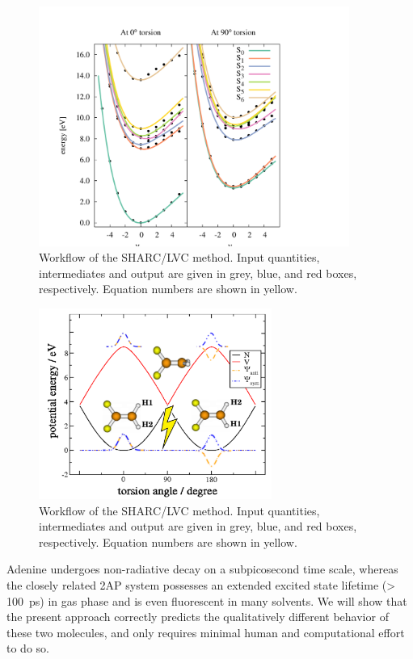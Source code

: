 \documentclass[twoside,twocolumn,9pt]{article}
\begin{document}
\begin{figure}
\centering
\includegraphics[width=4in]{mode11.pdf}
\caption{Workflow of the SHARC/LVC method. Input quantities, intermediates and output are given in grey, blue, and red boxes, respectively. Equation numbers are shown in yellow.}
\label{fig:flow}
\end{figure}
\begin{figure}
\includegraphics[width=3in]{pec1d}
\caption{Workflow of the SHARC/LVC method. Input quantities, intermediates and output are given in grey, blue, and red boxes, respectively. Equation numbers are shown in yellow.}
\label{fig:flow}
\end{figure}

Adenine undergoes non-radiative decay on a subpicosecond time scale,\cite{Ullrich2004,Evans2010,Barbatti2008,Fabiano2008,Alexandrova2010} whereas the closely related 2AP system possesses an extended excited state lifetime (> 100~ps) in gas phase\cite{Lobsiger2014} and is even fluorescent in many solvents.\cite{Guest1991,Fiebig2002} 
We will show that the present approach correctly predicts the qualitatively different behavior of these two molecules, and only requires minimal human and computational effort to do so.
\end{document}
